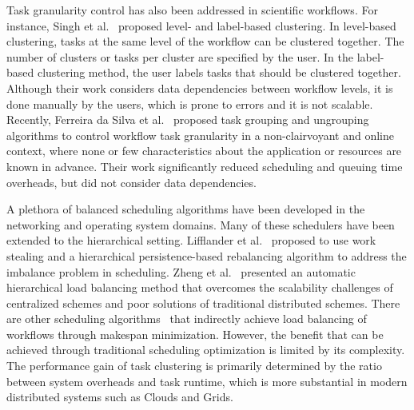 Task granularity control has also been addressed in scientific workflows. For instance, Singh et al.~\cite{Singh:2008:WTC:1341811.1341822} proposed level- and label-based clustering. In level-based clustering, tasks at the same level {of the workflow }can be clustered together. The number of clusters or tasks per cluster are specified by the user. In the label-based clustering {method}, the user labels tasks that should be clustered together. Although their work considers data dependencies between workflow levels, it is done manually by the users, which is prone to errors {and it is not scalable}. Recently, Ferreira da Silva et al.~\cite{Ferreira-granularity-2013,FerreiradaSilva-CCPE-2014} proposed task grouping and ungrouping algorithms to control workflow task granularity in a non-clairvoyant and online context, where none or few characteristics about the application or resources are known in advance. Their work significantly reduced scheduling and queuing time overheads, but did not consider data dependencies.

A plethora of balanced scheduling algorithms have been developed in the networking and operating system domains. Many of these schedulers have been extended to the hierarchical setting. Lifflander et al.~\cite{Lifflander} proposed to use work stealing and a hierarchical persistence-based rebalancing algorithm to address the imbalance problem in scheduling. Zheng et al.~\cite{Zheng} presented an automatic hierarchical load balancing method that overcomes the scalability challenges of centralized schemes and poor solutions of traditional distributed schemes. There are other scheduling algorithms~\cite{rizos2008} that indirectly achieve load balancing of workflows through makespan minimization. However, the benefit that can be achieved through traditional scheduling optimization is limited by its complexity. The performance gain of task clustering is primarily determined by the ratio between system overheads and task runtime, which is more substantial in modern distributed systems such as Clouds and Grids. 

